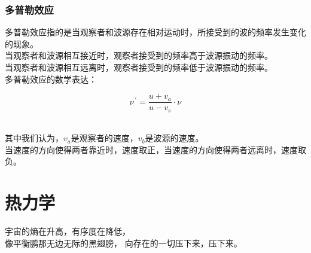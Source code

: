 \documentclass[UTF8]{ctexart}
\begin{document}
\subsubsection{多普勒效应}
    多普勒效应指的是当观察者和波源存在相对运动时，所接受到的波的频率发生变化的现象。\\[3mm]
    当观察者和波源相互接近时，观察者接受到的频率高于波源振动的频率。\\[2mm]
    当观察者和波源相互远离时，观察者接受到的频率低于波源振动的频率。\\[3mm]
    多普勒效应的数学表达：
    \begin{large}
        \begin{equation*}
            \nu^{\,'}=\frac{u+v_a}{u-v_s}\cdot\nu
        \end{equation*}
    \end{large}\\
    其中我们认为，$v_a$是观察者的速度，$v_b$是波源的速度。\\[3mm]
    当速度的方向使得两者靠近时，速度取正，当速度的方向使得两者远离时，速度取负。
\newpage

\section{热力学}
    宇宙的熵在升高，有序度在降低，\\
    像平衡鹏那无边无际的黑翅膀，
    向存在的一切压下来，压下来。
\end{document}
